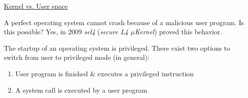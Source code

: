 \par{
	\noindent\underline{Kernel vs. User space}
	\par{
		\noindent
		A perfect operating system cannot crash because of a malicious user program. Is this possible? Yes, in 2009 \textit{sel4} (\textit{secure L4 $\mu$Kernel}) proved this behavior.
	}
	\par{
		\noindent
		The startup of an operating system is privileged. There exist two options to switch from user to privileged mode (in general):
		\parskip0pt\begin{enumerate}
			\item{User program is finished \& executes a privileged instruction}
			\item{A system call is executed by a user program}
		\end{enumerate}
		\begin{figure}[H]
			\centering
\end{figure}}}
